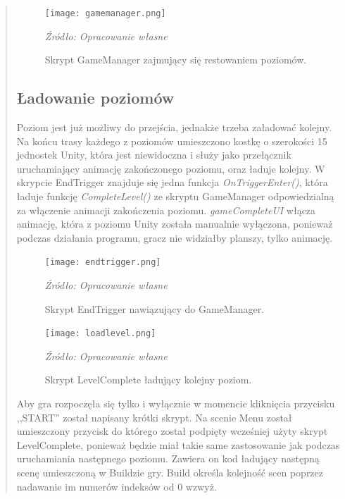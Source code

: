 \begin{quotation}
\begin{figure}[!hbt]
\centering
  \texttt{[image: gamemanager.png]}
  \caption{Skrypt GameManager zajmujący się restowaniem poziomów.}\label{rys_26}
  \begin{minipage}[t]{0.75\linewidth}
    \emph{Źródło: Opracowanie własne}
  \end{minipage}
\end{figure}

\newpage
\subsection{Ładowanie poziomów}
\indent Poziom jest już możliwy do przejścia, jednakże trzeba załadować kolejny. Na końcu trasy każdego z poziomów umieszczono kostkę o szerokości 15 jednostek Unity, która jest niewidoczna i służy jako przełącznik uruchamiający animację zakończonego poziomu, oraz ładuje kolejny. W skrypcie EndTrigger znajduje się jedna funkcja \textit{OnTriggerEnter()}, która ładuje funkcję \textit{CompleteLevel()} ze skryptu GameManager odpowiedzialną za włączenie animacji zakończenia poziomu. \textit{gameCompleteUI} włącza animację, która z poziomu Unity została manualnie wyłączona, ponieważ podczas działania programu, gracz nie widziałby planszy, tylko animację.

\begin{figure}[!ht]
\centering
  \texttt{[image: endtrigger.png]}
  \caption{Skrypt EndTrigger nawiązujący do GameManager.}\label{rys_27}
  \begin{minipage}[t]{0.75\linewidth}
    \emph{Źródło: Opracowanie własne}
  \end{minipage}
\end{figure}

\begin{figure}[!h]
\centering
  \texttt{[image: loadlevel.png]}
  \caption{Skrypt LevelComplete ładujący kolejny poziom.}\label{rys_28}
  \begin{minipage}[t]{0.75\linewidth}
    \emph{Źródło: Opracowanie własne}
  \end{minipage}
\end{figure}

\indent Aby gra rozpoczęła się tylko i wyłącznie w momencie kliknięcia przycisku ,,START'' został napisany krótki skrypt. Na scenie Menu został umieszczony przycisk do którego został podpięty wcześniej użyty skrypt LevelComplete, ponieważ będzie miał takie same zastosowanie jak podczas uruchamiania następnego poziomu. Zawiera on kod ładujący następną scenę umieszczoną w Buildzie gry. Build określa kolejność scen poprzez nadawanie im numerów indeksów od 0 wzwyż. 


\end{quotation}
